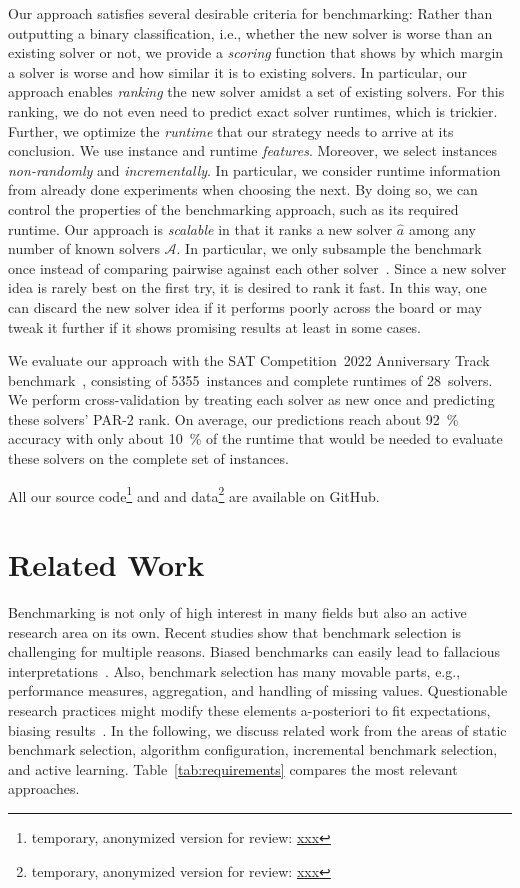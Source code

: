\documentclass[runningheads]{llncs}
\begin{document}
Our approach satisfies several desirable criteria for benchmarking:
Rather than outputting a binary classification, i.e., whether the new solver is worse than an existing solver or not, we provide a \emph{scoring} function that shows by which margin a solver is worse and how similar it is to existing solvers.
In particular, our approach enables \emph{ranking} the new solver amidst a set of existing solvers.
For this ranking, we do not even need to predict exact solver runtimes, which is trickier.
Further, we optimize the \emph{runtime} that our strategy needs to arrive at its conclusion.
We use instance and runtime \emph{features}.
Moreover, we select instances \emph{non-randomly} and \emph{incrementally}.
In particular, we consider runtime information from already done experiments when choosing the next.
By doing so, we can control the properties of the benchmarking approach, such as its required runtime.
Our approach is \emph{scalable} in that it ranks a new solver $\hat{a}$ among any number of known solvers $\mathcal{A}$.
In particular, we only subsample the benchmark once instead of comparing pairwise against each other solver~\cite{MatriconAFSH21}.
Since a new solver idea is rarely best on the first try, it is desired to rank it fast.
In this way, one can discard the new solver idea if it performs poorly across the board or may tweak it further if it shows promising results at least in some cases.

We evaluate our approach with the SAT Competition~2022 Anniversary Track benchmark~\cite{sat2022}, consisting of 5355~instances and complete runtimes of 28~solvers.
We perform cross-validation by treating each solver as new once and predicting these solvers' PAR-2 rank.
On average, our predictions reach about \SI{92}{\%} accuracy with only about \SI{10}{\%} of the runtime that would be needed to evaluate these solvers on the complete set of instances.

All our source code\footnote{temporary, anonymized version for review: \url{xxx}} and and data\footnote{temporary, anonymized version for review: \url{xxx}} are available on GitHub.


\section{Related Work}

Benchmarking is not only of high interest in many fields but also an active research area on its own.
Recent studies show that benchmark selection is challenging for multiple reasons.
Biased benchmarks can easily lead to fallacious interpretations~\cite{abs-2107-07002}.
Also, benchmark selection has many movable parts, e.g., performance measures, aggregation, and handling of missing values.
Questionable research practices might modify these elements a-posteriori to fit expectations, biasing results~\cite{NiesslHWCB22}.
In the following, we discuss related work from the areas of static benchmark selection, algorithm configuration, incremental benchmark selection, and active learning.
Table~\ref{tab:requirements} compares the most relevant approaches.
\end{document}
